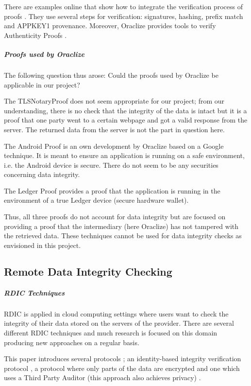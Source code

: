 There are examples online that show how to integrate the verification process of proofs \cite{relatedWork07}. They use several steps for verification: signatures, hashing, prefix match and APPKEY1 provenance. Moreover, Oraclize provides tools to verify Authenticity Proofs \cite{relatedWork08, relatedWork09}.

\subparagraph{Proofs used by Oraclize}
The following question thus arose: Could the proofs used by Oraclize be applicable in our project?

The TLSNotaryProof \cite{relatedWork10, relatedWork11, relatedWork12} does not seem appropriate for our project; from our understanding, there is no check that the integrity of the data is intact but it is a proof that one party went to a certain webpage and got a valid response from the server. The returned data from the server is not the part in question here.

The Android Proof \cite{relatedWork13} is an own development by Oraclize based on a Google technique. It is meant to ensure an application is running on a safe environment, i.e. the Android device is secure. There do not seem to be any securities concerning data integrity.

The Ledger Proof \cite{relatedWork14, relatedWork15} provides a proof that the application is running in the environment of a true Ledger device (secure hardware wallet).

Thus, all three proofs do not account for data integrity but are focused on providing a proof that the intermediary (here Oraclize) has not tampered with the retrieved data. These techniques cannot be used for data integrity checks as envisioned in this project.

\subsection{Remote Data Integrity Checking}
\subparagraph{RDIC Techniques}
RDIC is applied in cloud computing settings where users want to check the integrity of their data stored on the servers of the provider.
There are several different RDIC techniques \cite{relatedWork16} and much research is focused on this domain producing new approaches on a regular basis.

This paper introduces several protocols \cite{relatedWork17}; an identity-based integrity verification protocol \cite{relatedWork18}, a protocol where only parts of the data are encrypted \cite{relatedWork19} and one which uses a Third Party Auditor (this approach also achieves privacy) \cite{relatedWork20}.

